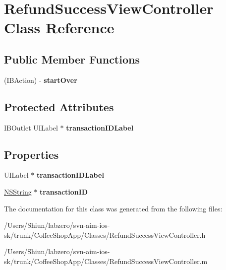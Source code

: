 \hypertarget{interface_refund_success_view_controller}{
\section{RefundSuccessViewController Class Reference}
\label{interface_refund_success_view_controller}
}
\subsection*{Public Member Functions}
\begin{DoxyCompactItemize}
\item 
\hypertarget{interface_refund_success_view_controller_a8415b8bf87378c47b4eddd1e95633a02}{
(IBAction) -\/ {\bfseries startOver}}
\label{interface_refund_success_view_controller_a8415b8bf87378c47b4eddd1e95633a02}

\end{DoxyCompactItemize}
\subsection*{Protected Attributes}
\begin{DoxyCompactItemize}
\item 
\hypertarget{interface_refund_success_view_controller_af13ceeaf74c5de4110f6ad4c6a96496e}{
IBOutlet UILabel $\ast$ {\bfseries transactionIDLabel}}
\label{interface_refund_success_view_controller_af13ceeaf74c5de4110f6ad4c6a96496e}

\end{DoxyCompactItemize}
\subsection*{Properties}
\begin{DoxyCompactItemize}
\item 
\hypertarget{interface_refund_success_view_controller_ae28ce19f5604dff0613057904da8cac6}{
UILabel $\ast$ {\bfseries transactionIDLabel}}
\label{interface_refund_success_view_controller_ae28ce19f5604dff0613057904da8cac6}

\item 
\hypertarget{interface_refund_success_view_controller_ae3a678efad7833dbb28d8a723667d15c}{
\hyperlink{class_n_s_string}{NSString} $\ast$ {\bfseries transactionID}}
\label{interface_refund_success_view_controller_ae3a678efad7833dbb28d8a723667d15c}

\end{DoxyCompactItemize}


The documentation for this class was generated from the following files:\begin{DoxyCompactItemize}
\item 
/Users/Shiun/labzero/svn-\/aim-\/ios-\/sk/trunk/CoffeeShopApp/Classes/RefundSuccessViewController.h\item 
/Users/Shiun/labzero/svn-\/aim-\/ios-\/sk/trunk/CoffeeShopApp/Classes/RefundSuccessViewController.m\end{DoxyCompactItemize}
